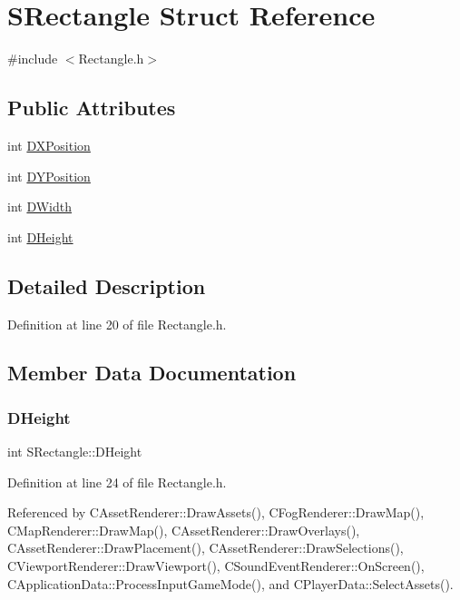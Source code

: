 \hypertarget{structSRectangle}{}\section{S\+Rectangle Struct Reference}
\label{structSRectangle}


{\ttfamily \#include $<$Rectangle.\+h$>$}

\subsection*{Public Attributes}
\begin{DoxyCompactItemize}
\item 
int \hyperlink{structSRectangle_abcbddb03b3ee416cc33109833b5f075c}{D\+X\+Position}
\item 
int \hyperlink{structSRectangle_a120aa0a90033bc6e07c36c151a3bbc71}{D\+Y\+Position}
\item 
int \hyperlink{structSRectangle_a4150898b3f7d90f6e4b0d44bf1ae3bd2}{D\+Width}
\item 
int \hyperlink{structSRectangle_a84ea3c2314c43cab6186170662188899}{D\+Height}
\end{DoxyCompactItemize}


\subsection{Detailed Description}


Definition at line 20 of file Rectangle.\+h.



\subsection{Member Data Documentation}
\hypertarget{structSRectangle_a84ea3c2314c43cab6186170662188899}{}\label{structSRectangle_a84ea3c2314c43cab6186170662188899} 
\subsubsection{\texorpdfstring{D\+Height}{DHeight}}
{\footnotesize\ttfamily int S\+Rectangle\+::\+D\+Height}



Definition at line 24 of file Rectangle.\+h.



Referenced by C\+Asset\+Renderer\+::\+Draw\+Assets(), C\+Fog\+Renderer\+::\+Draw\+Map(), C\+Map\+Renderer\+::\+Draw\+Map(), C\+Asset\+Renderer\+::\+Draw\+Overlays(), C\+Asset\+Renderer\+::\+Draw\+Placement(), C\+Asset\+Renderer\+::\+Draw\+Selections(), C\+Viewport\+Renderer\+::\+Draw\+Viewport(), C\+Sound\+Event\+Renderer\+::\+On\+Screen(), C\+Application\+Data\+::\+Process\+Input\+Game\+Mode(), and C\+Player\+Data\+::\+Select\+Assets().

